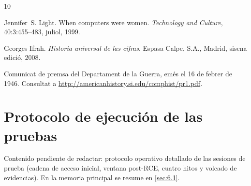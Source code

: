 \documentclass[11pt,spanish,listoffigures,listoftables]{tfgetsinf}
\begin{document}
\begin{thebibliography}{10}

   Jennifer~S. Light.
   \newblock When computers were women.
   \newblock \textit{Technology and Culture}, 40:3:455--483, juliol, 1999.

   Georges Ifrah.
   \newblock \textit{Historia universal de las cifras}.
   \newblock Espasa Calpe, S.A., Madrid, sisena edició, 2008.

   Comunicat de premsa del Departament de la Guerra, 
   emés el 16 de febrer de 1946. 
   \newblock Consultat a 
   \url{http://americanhistory.si.edu/comphist/pr1.pdf}.

\end{thebibliography}
\cleardoublepage


\APPENDIX


\chapter{Protocolo de ejecución de las pruebas}
\label{anexo:protocolo_ejecucion}

Contenido pendiente de redactar: protocolo operativo detallado de las sesiones de prueba (cadena de acceso inicial, ventana post-RCE, cuatro hitos y volcado de evidencias). En la memoria principal se resume en \cref{sec:6.1}.
\end{document}

